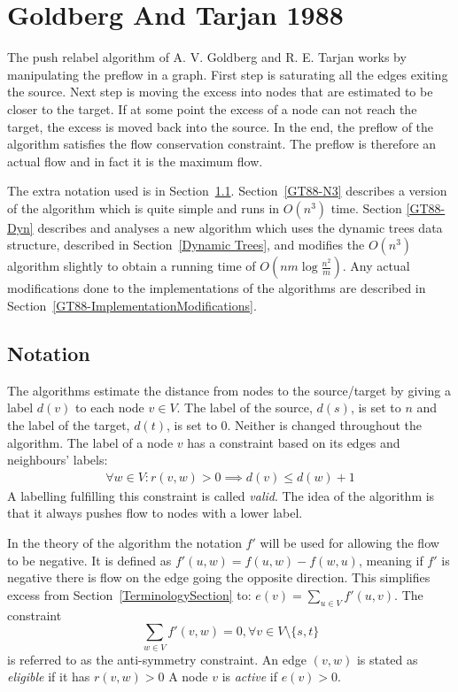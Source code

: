 \section{Goldberg And Tarjan 1988}
\label{GoldbergTarjanSection}
The push relabel algorithm of A. V. Goldberg and R. E. Tarjan \cite{Goldberg1988} works by manipulating the preflow in 
a graph. First step is saturating all the edges exiting the source. Next step is moving the excess into nodes that are estimated to be closer to the target.
If at some point the excess of a node can not reach the target, the excess is moved back into the source. In the end, the preflow of the algorithm
satisfies the flow conservation constraint. The preflow is therefore an actual flow and in fact it is the maximum flow. 

The extra notation used is in Section~\ref{GT88-Notation}. Section~\ref{GT88-N3} describes a version of the algorithm which is quite simple and runs in $O(n^3)$ time. Section
\ref{GT88-Dyn} describes and analyses a new algorithm which uses the dynamic trees data structure, described in Section~\ref{Dynamic Trees}, and modifies the $O(n^3)$ algorithm slightly
to obtain a running time of $O(nm\log{\frac{n^2}{m}})$. 
Any actual modifications done to the implementations of the algorithms are described in Section~\ref{GT88-ImplementationModifications}.

\subsection{Notation} \label{GT88-Notation}
The algorithms estimate the distance from nodes to the source/target by giving a label $d(v)$ to each node $v \in V$.
The label of the source, $d(s)$, is set to $n$ and the label of the target, $d(t)$, is set to 0. Neither is changed 
throughout the algorithm. The label of a node $v$ has a constraint based on its edges and neighbours' labels: 
\begin{align*}
\forall w \in V: r(v,w) > 0 \implies d(v) \leq d(w)+1
\end{align*}
A labelling fulfilling this constraint is called \emph{valid}. The idea of the algorithm is that it always pushes flow to nodes with a lower label.

In the theory of the algorithm the notation $f'$ will be used for allowing the flow to be negative. It is defined as $f'(u,w) = f(u,w)-f(w,u)$, meaning 
if $f'$ is negative there is flow on the edge going the opposite direction.
This simplifies excess from Section~\ref{TerminologySection} to: $e(v)=\sum_{u \in V}f'(u, v)$.
The constraint $$\sum_{w \in V}{f'(v,w)} = 0, \forall v \in V \setminus \{s,t\}$$ is referred to as the anti-symmetry constraint.
An edge $(v,w)$ is stated as \emph{eligible} if it has $r(v,w) > 0$
A node $v$ is \emph{active} if $e(v) > 0$.

